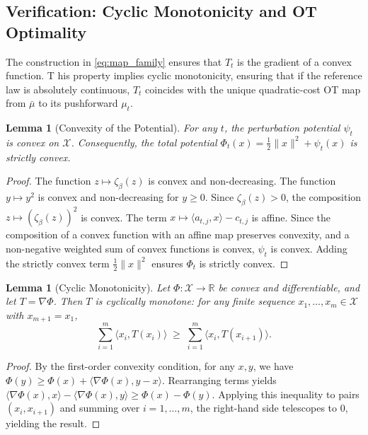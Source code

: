 \documentclass{article}
\theoremstyle{plain}
\newtheorem{lemma}[theorem]{Lemma}
\theoremstyle{definition}
\theoremstyle{remark}
\begin{document}
\subsection{Verification: Cyclic Monotonicity and OT Optimality}\label{app:cyclic_monotone}
The construction in \eqref{eq:map_family} ensures that $T_t$ is the gradient of a convex function. T
his property implies cyclic monotonicity, ensuring that if the reference law is absolutely continuous, $T_t$ coincides with the unique quadratic-cost OT map from $\bar{\mu}$ to its pushforward $\mu_t$.
\begin{lemma}[Convexity of the Potential]\label{lem:phi_convex}
For any $t$, the perturbation potential $\psi_t$ is convex on $\mathcal{X}$. 
Consequently, the total potential $\Phi_t(x) = \frac{1}{2}\|x\|^2 + \psi_t(x)$ is strictly convex.
\end{lemma}

\begin{proof}
The function $z \mapsto \zeta_\beta(z)$ is convex and non-decreasing. The function $y \mapsto y^2$ is convex and non-decreasing for $y \ge 0$. 
Since $\zeta_\beta(z) > 0$, the composition $z \mapsto (\zeta_\beta(z))^2$ is convex. 
The term $x \mapsto \langle a_{t,j}, x\rangle - c_{t,j}$ is affine. Since the composition of a convex function with an affine map preserves convexity, and a non-negative weighted sum of convex functions is convex, $\psi_t$ is convex. 
Adding the strictly convex term $\frac{1}{2}\|x\|^2$ ensures $\Phi_t$ is strictly convex.
\end{proof}

\begin{lemma}[Cyclic Monotonicity]
\label{lem:cyclic_mono}
Let $\Phi: \mathcal{X} \to \mathbb{R}$ be convex and differentiable, and let $T = \nabla \Phi$. 
Then $T$ is cyclically monotone: for any finite sequence $x_1, \dots, x_m \in \mathcal{X}$ with $x_{m+1} = x_1$,$$  \sum_{i=1}^m \langle x_i, T(x_i) \rangle
\;\ge\;
\sum_{i=1}^m \langle x_i, T(x_{i+1}) \rangle.$$
\end{lemma}

\begin{proof}
By the first-order convexity condition, for any $x, y$, we have $\Phi(y) \ge \Phi(x) + \langle \nabla \Phi(x), y-x \rangle$. 
Rearranging terms yields $\langle \nabla \Phi(x), x \rangle - \langle \nabla \Phi(x), y \rangle \ge \Phi(x) - \Phi(y)$. 
Applying this inequality to pairs $(x_i, x_{i+1})$ and summing over $i=1, \dots, m$, the right-hand side telescopes to 0, yielding the result.
\end{proof}
\end{document}
